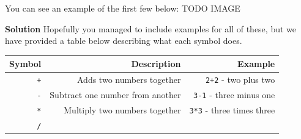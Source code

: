 \documentclass[12pt,]{krantz}
\begin{document}
You can see an example of the first few below:
TODO IMAGE

\textbf{Solution }
Hopefully you managed to include examples for all of these, but we have provided a table below describing what each symbol does.

\begin{longtable}[]{@{}rrr@{}}
\toprule
\begin{minipage}[b]{0.30\columnwidth}\raggedleft
Symbol\strut
\end{minipage} & \begin{minipage}[b]{0.30\columnwidth}\raggedleft
Description\strut
\end{minipage} & \begin{minipage}[b]{0.30\columnwidth}\raggedleft
Example\strut
\end{minipage}\tabularnewline
\midrule
\endhead
\begin{minipage}[t]{0.30\columnwidth}\raggedleft
\texttt{+}\strut
\end{minipage} & \begin{minipage}[t]{0.30\columnwidth}\raggedleft
Adds two numbers together\strut
\end{minipage} & \begin{minipage}[t]{0.30\columnwidth}\raggedleft
\texttt{2+2} - two plus two\strut
\end{minipage}\tabularnewline
\begin{minipage}[t]{0.30\columnwidth}\raggedleft
\texttt{-}\strut
\end{minipage} & \begin{minipage}[t]{0.30\columnwidth}\raggedleft
Subtract one number from another\strut
\end{minipage} & \begin{minipage}[t]{0.30\columnwidth}\raggedleft
\texttt{3-1} - three minus one\strut
\end{minipage}\tabularnewline
\begin{minipage}[t]{0.30\columnwidth}\raggedleft
\texttt{*}\strut
\end{minipage} & \begin{minipage}[t]{0.30\columnwidth}\raggedleft
Multiply two numbers together\strut
\end{minipage} & \begin{minipage}[t]{0.30\columnwidth}\raggedleft
\texttt{3*3} - three times three\strut
\end{minipage}\tabularnewline
\begin{minipage}[t]{0.30\columnwidth}\raggedleft
\texttt{/}\strut

\end{minipage}
\end{longtable}
\end{document}
